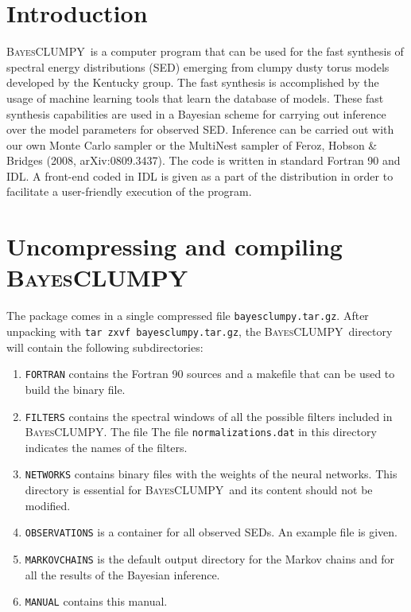 \documentclass[12pt]{article}
\def\B{\textsc{BayesCLUMPY}}
\begin{document}
\newpage

\section{Introduction}

\B\ is a computer program that can be used for the fast synthesis of spectral
energy distributions (SED) emerging from clumpy dusty torus models developed by
the Kentucky group. The fast synthesis is accomplished by the usage
of machine learning tools that learn the database of models. These fast
synthesis capabilities are used in a Bayesian scheme for carrying out 
inference over the model parameters for observed SED. Inference can be carried out
with our own Monte Carlo sampler or the MultiNest sampler of Feroz, Hobson \& Bridges 
(2008, arXiv:0809.3437).
The code is written in standard Fortran 90 and IDL. A
front-end coded in IDL is given as a part of the 
distribution in order to facilitate a user-friendly execution of the program.

\section{Uncompressing and compiling \B}

The package comes in a single compressed file \texttt{bayesclumpy.tar.gz}. After
unpacking with \texttt{tar zxvf bayesclumpy.tar.gz}, the \B\ directory
will contain the following subdirectories:

\begin{enumerate}
\item
{\tt FORTRAN} contains the Fortran 90 sources and a makefile that can be used
to build the binary file.
\item
{\tt FILTERS} contains the spectral windows of all the possible filters included in \B. The
file The file {\tt normalizations.dat} in this directory indicates the names of the filters.
\item
{\tt NETWORKS} contains binary files with the weights of the neural networks. This directory is
essential for \B\ and its content should not be modified.
\item
{\tt OBSERVATIONS} is a container for all observed SEDs. An example file is given. 
\item
{\tt MARKOVCHAINS} is the default output directory for the Markov chains and for all the
results of the Bayesian inference.
\item
{\tt MANUAL} contains this manual. 
\end{enumerate}
\end{document}
